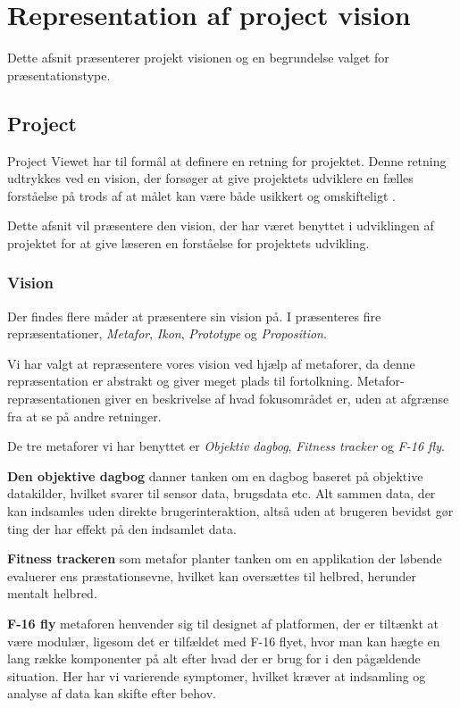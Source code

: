 \section{Representation af project vision}
Dette afsnit præsenterer projekt visionen og en begrundelse valget for præsentationstype.
\subsection{Project}
Project Viewet har til formål at definere en retning for projektet.
Denne retning udtrykkes ved en vision, der forsøger at give projektets udviklere en fælles forståelse på trods af at målet kan være både usikkert og omskifteligt \cite[Kapitel 15 - Project]{art:essence}.

Dette afsnit vil præsentere den vision, der har været benyttet i udviklingen af projektet for at give læseren en forståelse for projektets udvikling.

\subsubsection{Vision}\label{vision}
Der findes flere måder at præsentere sin vision på. 
I \citet[Kapitel 24 - Representation]{art:essence} præsenteres fire repræsentationer, \textit{Metafor}, \textit{Ikon}, \textit{Prototype} og \textit{Proposition}.

Vi har valgt at repræsentere vores vision ved hjælp af metaforer, da denne repræsentation er abstrakt og giver meget plads til fortolkning.
Metafor-repræsentationen giver en beskrivelse af hvad fokusområdet er, uden at afgrænse fra at se på andre retninger.

De tre metaforer vi har benyttet er \textit{Objektiv dagbog}, \textit{Fitness tracker} og \textit{F-16 fly}.

\textbf{Den objektive dagbog} danner tanken om en dagbog baseret på objektive datakilder, hvilket svarer til sensor data, brugsdata etc.
Alt sammen data, der kan indsamles uden direkte brugerinteraktion, altså uden at brugeren bevidst gør ting der har effekt på den indsamlet data.

\textbf{Fitness trackeren} som metafor planter tanken om en applikation der løbende evaluerer ens præstationsevne, hvilket kan oversættes til helbred, herunder mentalt helbred.

\textbf{F-16 fly}\label{vision::fly} metaforen henvender sig til designet af platformen, der er tiltænkt at være modulær, ligesom det er tilfældet med F-16 flyet, hvor man kan hægte en lang række komponenter på alt efter hvad der er brug for i den pågældende situation.
Her har vi varierende symptomer, hvilket kræver at indsamling og analyse af data kan skifte efter behov.

